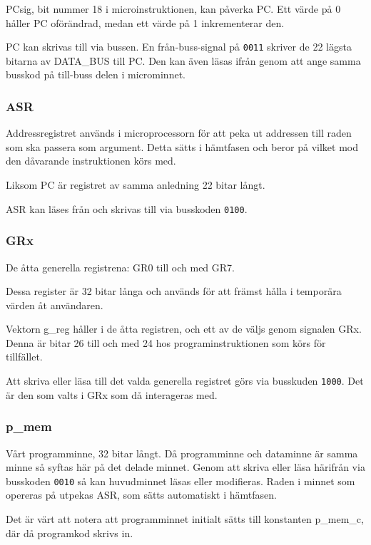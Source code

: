 \documentclass[]{article}
\begin{document}
PCsig, bit nummer 18 i microinstruktionen, kan påverka PC. Ett värde på 0 håller PC oförändrad, medan ett värde på 1 inkrementerar den.

PC kan skrivas till via bussen. En från-buss-signal på \texttt{0011} skriver de 22 lägsta bitarna av DATA\_BUS till PC. Den kan även läsas ifrån genom att ange samma busskod på till-buss delen i microminnet.

\subsubsection{ASR}

Addressregistret används i microprocessorn för att peka ut addressen till raden som ska passera som argument. Detta sätts i hämtfasen och beror på vilket mod den dåvarande instruktionen körs med.

Liksom PC är registret av samma anledning 22 bitar långt.

ASR kan läses från och skrivas till via busskoden \texttt{0100}.

\subsubsection{GRx}

De åtta generella registrena: GR0 till och med GR7.

Dessa register är 32 bitar långa och används för att främst hålla i temporära värden åt användaren.

Vektorn g\_reg håller i de åtta registren, och ett av de väljs genom signalen GRx. Denna är bitar 26 till och med 24 hos programinstruktionen som körs för tillfället.

Att skriva eller läsa till det valda generella registret görs via busskuden \texttt{1000}. Det är den som valts i GRx som då interageras med. 

\subsubsection{p\_mem}

Vårt programminne, 32 bitar långt. Då programminne och dataminne är samma minne så syftas här på det delade minnet. Genom att skriva eller läsa härifrån via busskoden \texttt{0010} så kan huvudminnet läsas eller modifieras. Raden i minnet som opereras på utpekas ASR, som sätts automatiskt i hämtfasen.

Det är värt att notera att programminnet initialt sätts till konstanten p\_mem\_c, där då programkod skrivs in.
\end{document}
